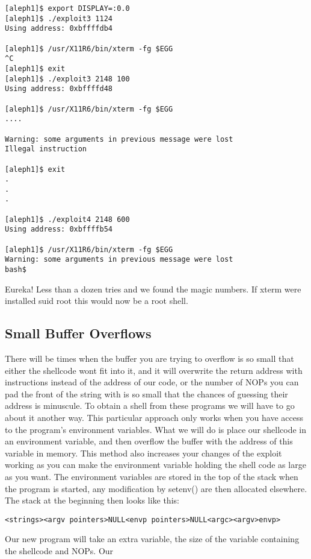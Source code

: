 \documentclass[12pt]{article}
\begin{document}
\begin{verbatim}
[aleph1]$ export DISPLAY=:0.0
[aleph1]$ ./exploit3 1124
Using address: 0xbffffdb4

[aleph1]$ /usr/X11R6/bin/xterm -fg $EGG
^C
[aleph1]$ exit
[aleph1]$ ./exploit3 2148 100
Using address: 0xbffffd48

[aleph1]$ /usr/X11R6/bin/xterm -fg $EGG
....

Warning: some arguments in previous message were lost
Illegal instruction

[aleph1]$ exit
.
.
.

[aleph1]$ ./exploit4 2148 600
Using address: 0xbffffb54

[aleph1]$ /usr/X11R6/bin/xterm -fg $EGG
Warning: some arguments in previous message were lost
bash$
\end{verbatim}


Eureka! Less than a dozen tries and we found the magic numbers. If xterm were installed suid root this would 
now be a root shell. 

\subsection{Small Buffer Overflows}
There will be times when  the buffer you are trying to overflow is so small that either the shellcode wont fit into 
it, and it will overwrite the return address with instructions instead of the address of our code, or the number of 
NOPs you can pad the front of the string with is so small that the chances of guessing their address is 
minuscule. To obtain a shell from these programs we will have to go about it another way. This particular 
approach only works when you have access to the program's environment variables. What we will do is place 
our shellcode in an environment variable, and then overflow the buffer with the address of this variable in 
memory. This method also increases your changes of the exploit working as you can make the environment 
variable holding the shell code as large as you want. The environment variables are stored in the top of the stack 
when the program is started, any modification by setenv() are then allocated elsewhere. The stack at the 
beginning then looks like this:

\begin{verbatim}
<strings><argv pointers>NULL<envp pointers>NULL<argc><argv>envp> 
\end{verbatim}

Our new program will take an extra variable, the size of the variable containing the shellcode and NOPs. Our 
\end{document}
